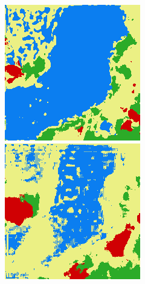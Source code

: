 \begin{figure}
    \includegraphics[width=\DensenetPredictionsImageWidth]{images/densenet/densenet-67D/101444-prediction} \hfill
    \includegraphics[width=\DensenetPredictionsImageWidth]{images/densenet/densenet-56D/101444-prediction}


\end{figure}
